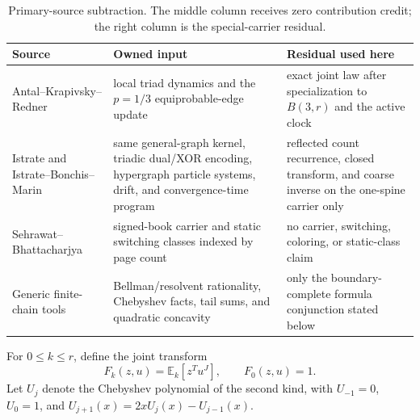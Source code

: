\documentclass[a4paper,10pt]{amsart}
\theoremstyle{remark}
\newcommand{\E}{\mathbb E}
\begin{document}
\begin{table}[ht]
\centering
\small
\caption{Primary-source subtraction.  The middle column receives zero
contribution credit; the right column is the special-carrier residual.}
\label{tab:subtraction}
\begin{tabular}{@{}>{\raggedright\arraybackslash}p{}
                    >{\raggedright\arraybackslash}p{}
                    >{\raggedright\arraybackslash}p{}@{}}
\toprule
Source & Owned input & Residual used here \\
\midrule
Antal--Krapivsky--Redner~\cite{AntalKrapivskyRedner2005,AntalKrapivskyRedner2006}
& local triad dynamics and the $p=1/3$ equiprobable-edge update
& exact joint law after specialization to $B(3,r)$ and the active clock \\
Istrate and Istrate--Bonchis--Marin~\cite{Istrate2009,IstrateBonchisMarin2019}
& same general-graph kernel, triadic dual/XOR encoding, hypergraph
particle systems, drift, and convergence-time program
& reflected count recurrence, closed transform, and coarse inverse on the
one-spine carrier only \\
Sehrawat--Bhattacharjya~\cite{SehrawatBhattacharjya2022}
& signed-book carrier and static switching classes indexed by page count
& no carrier, switching, coloring, or static-class claim \\
Generic finite-chain tools
& Bellman/resolvent rationality, Chebyshev facts, tail sums, and quadratic
concavity
& only the boundary-complete formula conjunction stated below \\
\bottomrule
\end{tabular}
\end{table}

For $0\leq k\leq r$, define the joint transform
\begin{equation}\label{eq:F-def}
 F_k(z,u)=\E_k[z^T u^J],\qquad F_0(z,u)=1.
\end{equation}
Let $U_j$ denote the Chebyshev polynomial of the second kind, with
$U_{-1}=0$, $U_0=1$, and
$U_{j+1}(x)=2xU_j(x)-U_{j-1}(x)$.
\end{document}
